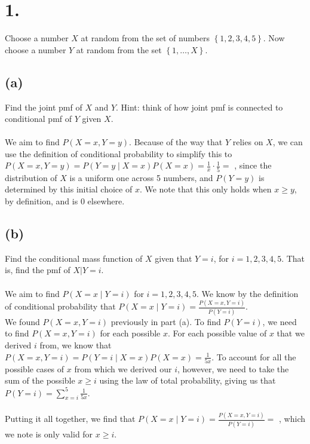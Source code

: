 \documentclass{article}
\begin{document}
\thispagestyle{firstpageheader}

\section*{1.}
{\Large 
Choose a number $X$ at random from the set of numbers
$\left\{ 1,2,3,4,5\right\} $. Now choose a number $Y$ at random from the set $\left\{ 1,\dots,X\right\} $. 

\subsection*{(a)}
Find the joint pmf of $X$ and $Y$. Hint: think of how  joint pmf  is connected to conditional pmf of $Y$ given $X$. \\ \\
We aim to find $P(X = x, Y = y)$. Because of the way that $Y$ relies on $X$, we can use the definition of conditional probability to simplify this to $P(X = x, Y = y) = P(Y = y \mid X = x)P(X = x) = \frac{1}{x} \cdot \frac{1}{5} = $ , since the distribution of $X$ is a uniform one across 5 numbers, and $P(Y = y)$ is determined by this initial choice of $x$. We note that this only holds when $x \geq y$, by definition, and is 0 elsewhere.

\subsection*{(b)}
Find the conditional mass function of $X$ given that $Y=i$,
for $i=1,2,3,4,5$. That is, find the pmf of $X|{Y=i}$. \\ \\ 
We aim to find $P(X = x \mid Y = i)$ for $i = 1,2,3,4,5$. We know by the definition of conditional probability that $P(X = x \mid Y = i) = \frac{P(X = x, Y = i)}{P(Y = i)}$. \\
We found $P(X = x, Y = i)$ previously in part (a). To find $P(Y = i)$, we need to find $P(X = x, Y = i)$ for each possible $x$. For each possible value of $x$ that we derived $i$ from, we know that $P(X = x, Y = i) = P(Y = i \mid X = x)P(X = x) = \frac{1}{5x}$. To account for all the possible cases of $x$ from which we derived our $i$, however, we need to take the sum of the possible $x \geq i$ using the law of total probability, giving us that $P(Y = i) = \sum_{x = i}^{5} \frac{1}{5x}$. \\ \\ 
Putting it all together, we find that $P(X = x \mid Y = i) = \frac{P(X = x, Y = i)}{P(Y = i)} = $ , which we note is only valid for $x \geq i$.

}
\end{document}
